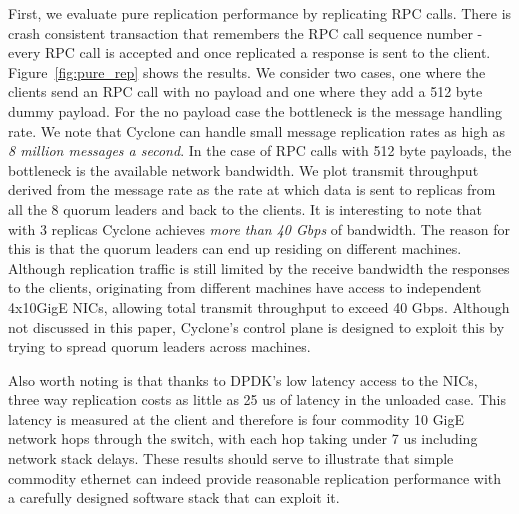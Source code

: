 \documentclass[letterpaper,twocolumn,10pt]{article}
\begin{document}
First, we evaluate pure replication performance by replicating RPC calls. There
is crash consistent transaction that remembers the RPC call sequence number -
every RPC call is accepted and once replicated a response is sent to the
client. Figure~\ref{fig:pure_rep} shows the results. We consider two cases, one
where the clients send an RPC call with no payload and one where they add a 512
byte dummy payload. For the no payload case the bottleneck is the message
handling rate. We note that Cyclone can handle small message replication rates
as high as \emph{8 million messages a second}. In the case of RPC calls with 512
byte payloads, the bottleneck is the available network bandwidth. We plot
transmit throughput derived from the message rate as the rate at which data is
sent to replicas from all the 8 quorum leaders and back to the clients.
It is interesting to note that with 3 replicas Cyclone achieves \emph{more than
  40 Gbps} of bandwidth. The reason for this is that the quorum leaders can end
up residing on different machines. Although replication traffic is still limited
by the receive bandwidth the responses to the clients, originating from
different machines have access to independent 4x10GigE NICs, allowing total
transmit throughput to exceed 40 Gbps. Although not discussed in this paper,
Cyclone's control plane is designed to exploit this by trying to spread quorum
leaders across machines.

Also worth noting is that thanks to DPDK's low latency access to the NICs, three
way replication costs as little as 25 us of latency in the unloaded case. This
latency is measured at the client and therefore is four commodity 10 GigE
network hops through the switch, with each hop taking under 7 us including
network stack delays. These results should serve to illustrate that simple
commodity ethernet can indeed provide reasonable replication performance with a
carefully designed software stack that can exploit it.
\end{document}
